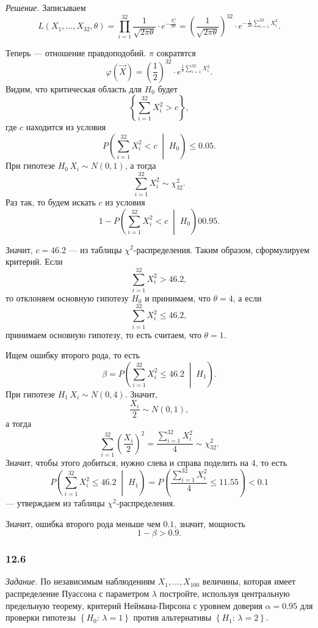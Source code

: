 \textit{Решение.} Записываем
$$L \left( X_1, \dotsc, X_{32}, \theta \right) =
  \prod \limits_{i = 1}^{32} \frac{1}{ \sqrt{2 \pi \theta }} \cdot e^{- \frac{X_i^2}{2 \theta }} =
  \left( \frac{1}{ \sqrt{2 \pi \theta }} \right)^{32} \cdot
  e^{- \frac{1}{2 \theta} \sum \limits_{i = 1}^{32} X_i^2}.$$

Теперь --- отношение правдоподобий.
$ \pi $ сократятся
$$ \varphi \left( \vec{X} \right) =
   \left( \frac{1}{2} \right)^{32} \cdot e^{\frac{1}{8} \sum \limits_{i = 1}^{32} X_i^2}.$$
Видим, что критическая область для $H_0$ будет
$$ \left\{ \sum \limits_{i = 1}^{32} X_i^2 > c \right\},$$
где $c$ находится из условия
$$P \left( \sum \limits_{i = 1}^{32} X_i^2 < c \; \middle| \; H_0 \right) \leq
  0.05.$$
При гипотезе $H_0 \, X_i \sim N \left( 0, 1 \right) $, а тогда
$$ \sum \limits_{i = 1}^{32} X_i^2 \sim
  \chi_{32}^2.$$
Раз так, то будем искать $c$ из условия
$$1 - P \left( \sum \limits_{i = 1}^{32} X_i^2 < c \; \middle| \; H_0 \right) 0
  0.95.$$

Значит, $c = 46.2$ --- из таблицы $ \chi^2$-распределения.
Таким образом, сформулируем критерий.
Если
$$ \sum \limits_{i = 1}^{32} X_i^2 >
  46.2,$$
то отклоняем основную гипотезу $H_0$ и принимаем, что $ \theta = 4$, а если
$$ \sum \limits_{i = 1}^{32} X_i^2 \leq
  46.2,$$
принимаем основную гипотезу, то есть считаем, что $ \theta = 1$.

Ищем ошибку второго рода, то есть
$$ \beta =
  P \left( \sum \limits_{i = 1}^{32} X_i^2 \leq 46.2 \; \middle| \; H_1 \right).$$
При гипотезе $H_1 \, X_i \sim N \left( 0, 4 \right) $.
Значит,
$$ \frac{X_i}{2} \sim
  N \left( 0, 1 \right),$$
а тогда
$$ \sum \limits_{i = 1}^{32} \left( \frac{X_i}{2} \right)^2 =
  \frac{ \sum \limits_{i = 1}^{32} X_i^2}{4} \sim
  \chi_{32}^2.$$
Значит, чтобы этого добиться, нужно слева и справа поделить на 4, то есть
$$P \left( \sum \limits_{i = 1}^{32} X_i^2 \leq 46.2 \; \middle| \; H_1 \right) =
  P \left( \frac{ \sum \limits_{i = 1}^{32} X_i^2}{4} \leq 11.55 \right) <
  0.1$$
--- утверждаем из таблицы $ \chi^2$-распределения.

Значит, ошибка второго рода меньше чем $0.1$, значит, мощность
$$1 - \beta >
  0.9.$$

\subsubsection*{12.6}

\textit{Задание.}
По независимым наблюдениям $X_1, \dotsc, X_{100}$ величины,
которая имеет распределение Пуассона с параметром $ \lambda $ постройте,
используя центральную предельную теорему,
критерий Неймана-Пирсона с уровнем доверия $ \alpha = 0.95$ для проверки гипотезы
$ \left\{ H_0: \, \lambda = 1 \right\} $ против альтернативы
$ \left\{ H_1: \, \lambda = 2 \right\} $.

